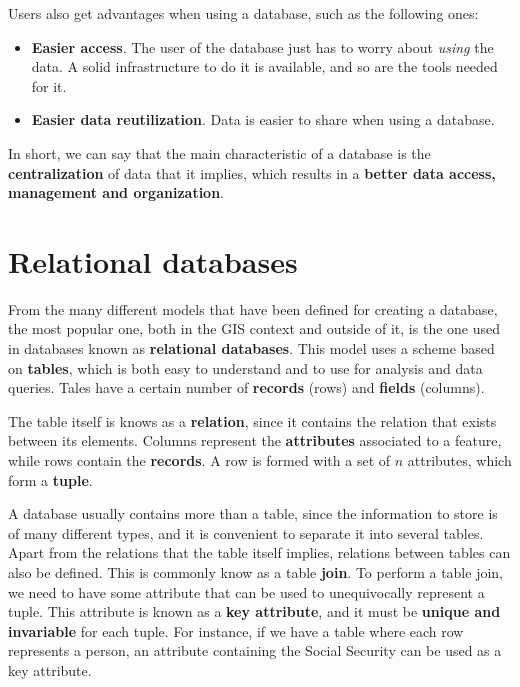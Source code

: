 Users also get advantages when using a database, such as the following ones:

\begin{itemize}
	\item \textbf{Easier access}. The user of the database just has to worry about \emph{using} the data. A solid infrastructure to do it is available, and so are the tools needed for it.
	\item \textbf{Easier data reutilization}. Data is easier to share when using a database.
\end{itemize}

In short, we can say that the main characteristic of a database is the \textbf{centralization} of data that it implies, which results in a \textbf{better data access, management and organization}.


\section{Relational databases}

From the many different models that have been defined for creating a database, the most popular one, both in the GIS context and outside of it, is the one used in databases known as \textbf{relational databases}. This model uses a scheme based on \textbf{tables}, which is both easy to understand and to use for analysis and data queries. Tales have a certain number of \textbf{records} (rows) and \textbf{fields} (columns).

The table itself is knows as a \textbf{relation}, since it contains the relation that exists between its elements. Columns represent the \textbf{attributes} associated to a feature, while rows contain the \textbf{records}. A row is formed with a set of $n$ attributes, which form a \textbf{tuple}.

A database usually contains more than a table, since the information to store is of many different types, and it is convenient to separate it into several tables. Apart from the relations that the table itself implies, relations between tables can also be defined. This is commonly know as a table \textbf{join}. To perform a table join, we need to have some attribute that can be used to unequivocally represent a tuple. This attribute is known as a \textbf{key attribute}, and it must be \textbf{unique and invariable} for each tuple. For instance, if we have a table where each row represents a person, an attribute containing the Social Security can be used as a key attribute.

